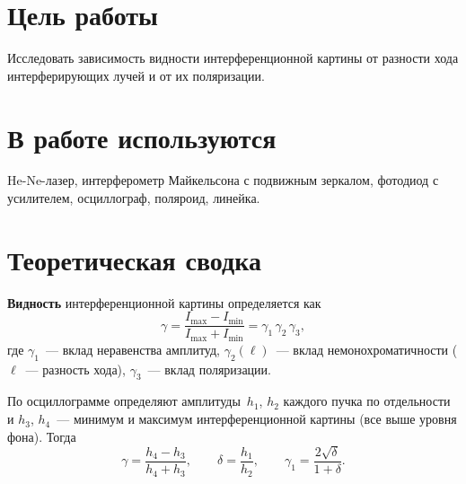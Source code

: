 \documentclass[twoside]{mfitjournal}
\begin{document}
\author{Евгений Иванов}
\email{}{}

\makeatletter
\renewcommand{\tit}{}
\renewcommand{\@oddhead}{}
\renewcommand{\@evenhead}{}
\makeatother

\pagestyle{fancy}
\fancyhf{}

\maketitle

\section*{Цель работы}

Исследовать зависимость видности интерференционной картины от разности хода интерферирующих лучей и от их поляризации.

\section*{В работе используются}

He-Ne-лазер, интерферометр Майкельсона с подвижным зеркалом, фотодиод с усилителем, осциллограф, поляроид, линейка.

\section*{Теоретическая сводка}

\textbf{Видность} интерференционной картины определяется как
\begin{equation}\label{eq:vis}
  \gamma = \frac{I_{\max} - I_{\min}}{I_{\max} + I_{\min}} = \gamma_1\,\gamma_2\,\gamma_3,
\end{equation}
где $\gamma_1$~--- вклад неравенства амплитуд, $\gamma_2(\ell)$~--- вклад немонохроматичности ($\ell$~--- разность хода), $\gamma_3$~--- вклад поляризации.

По осциллограмме определяют амплитуды~$h_1$, $h_2$ каждого пучка по отдельности и $h_3$, $h_4$~--- минимум и максимум интерференционной картины (все выше уровня фона). Тогда
\begin{equation}\label{eq:Vexp}
  \gamma = \frac{h_4 - h_3}{h_4 + h_3}, \qquad
  \delta = \frac{h_1}{h_2}, \qquad
  \gamma_1 = \frac{2\sqrt{\delta}}{1+\delta}.
\end{equation}
\end{document}
